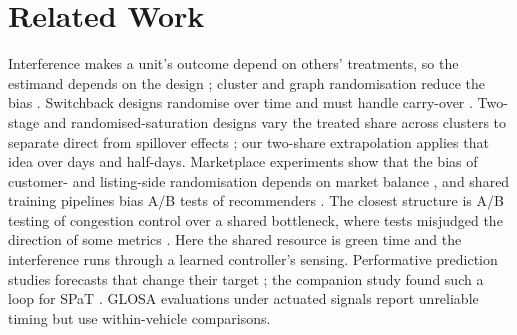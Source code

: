 \section{Related Work}\label{sec:related}
Interference makes a unit's outcome depend on others' treatments, so the estimand depends on the design
\cite{savje2021,hu2022}; cluster and graph randomisation reduce the bias \cite{eckles2017}. Switchback designs randomise over time and
must handle carry-over \cite{bojinov2023}. Two-stage and randomised-saturation designs vary the treated share across clusters to separate direct from spillover
effects \cite{hudgens2008,baird2018}; our two-share extrapolation applies that idea over days and half-days. Marketplace experiments show that the bias of customer- and listing-side randomisation
depends on market balance \cite{johari2022}, and shared training pipelines bias A/B tests of recommenders \cite{si2023,brennan2023}. The
closest structure is A/B testing of congestion control over a shared bottleneck, where tests misjudged the direction of some metrics
\cite{spang2021}. Here the shared resource is green time and the interference runs through a learned controller's sensing. Performative
prediction studies forecasts that change their target \cite{perdomo2020,narang2023,mandal2023}; the companion study found such a loop
for SPaT \cite{nguyen2026tsi}. GLOSA evaluations under actuated signals report unreliable timing \cite{stevanovic2013} but use
within-vehicle comparisons.

